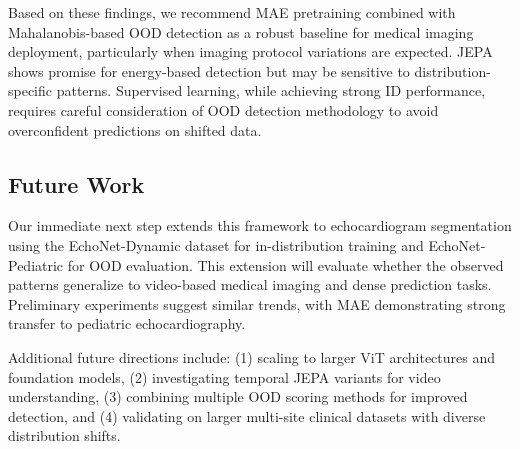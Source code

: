 \documentclass[11pt,a4paper]{article}
\begin{document}
Based on these findings, we recommend MAE pretraining combined with Mahalanobis-based OOD detection as a robust baseline for medical imaging deployment, particularly when imaging protocol variations are expected. JEPA shows promise for energy-based detection but may be sensitive to distribution-specific patterns. Supervised learning, while achieving strong ID performance, requires careful consideration of OOD detection methodology to avoid overconfident predictions on shifted data.

\subsection{Future Work}

Our immediate next step extends this framework to echocardiogram segmentation using the EchoNet-Dynamic dataset for in-distribution training and EchoNet-Pediatric for OOD evaluation. This extension will evaluate whether the observed patterns generalize to video-based medical imaging and dense prediction tasks. Preliminary experiments suggest similar trends, with MAE demonstrating strong transfer to pediatric echocardiography.

Additional future directions include: (1) scaling to larger ViT architectures and foundation models, (2) investigating temporal JEPA variants for video understanding, (3) combining multiple OOD scoring methods for improved detection, and (4) validating on larger multi-site clinical datasets with diverse distribution shifts.
\end{document}
